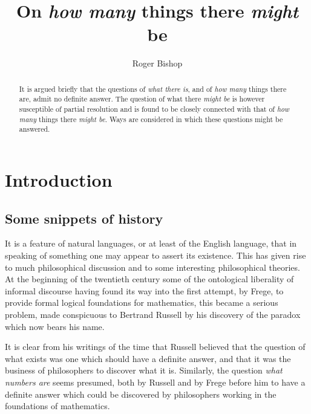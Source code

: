 \documentclass{rbjk}
\begin{document}
                                                                                   
\begin{article}
\begin{opening}  
\title{On {\it how many} things there {\it might} be}
\author{Roger Bishop }

\begin{abstract}
It is argued briefly that the questions of {\it what there is}, and of {\it how many} things there are, admit no definite answer.
The question of what there {\it might be} is however susceptible of partial resolution and is found to be closely connected with that of {\it how many} things there {\it might be}.
Ways are considered in which these questions might be answered.
\end{abstract}
\end{opening}

\section{Introduction}

\subsection{Some snippets of history}

It is a feature of natural languages, or at least of the English language, that in speaking of something one may appear to assert its existence.
This has given rise to much philosophical discussion and to some interesting philosophical theories.
At the beginning of the twentieth century some of the ontological liberality of informal discourse having found its way into the first attempt, by Frege, to provide formal logical foundations for mathematics, this became a serious problem, made conspicuous to Bertrand Russell by his discovery of the paradox which now bears his name.

It is clear from his writings of the time that Russell believed that the question of what exists was one which should have a definite answer, and that it was the business of philosophers to discover what it is.
Similarly, the question {\it what numbers are} seems presumed, both by Russell and by Frege before him to have a definite answer which could be discovered by philosophers working in the foundations of mathematics.


\end{article}
\end{document}

